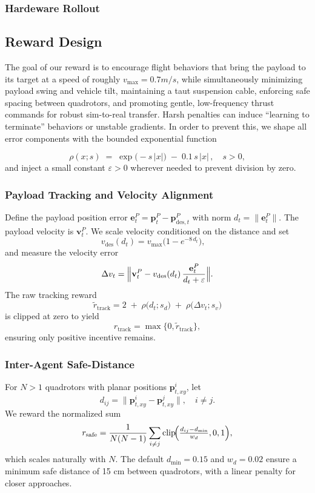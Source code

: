 \subsubsection{Hardeware Rollout}




\subsection{Reward Design}
The goal of our reward is to encourage flight behaviors that bring the payload to its target at a speed of roughly $ v_{\max} = 0.7m/s$, while simultaneously minimizing payload swing and vehicle tilt, maintaining a taut suspension cable, enforcing safe spacing between quadrotors, and promoting gentle, low-frequency thrust commands for robust sim-to-real transfer. Harsh penalties can induce “learning to terminate” behaviors or unstable gradients. In order to prevent this, we shape all error components with the bounded exponential function

\[
\rho(x; s) \;=\;\exp\bigl(-s\,|x|\bigr)\;-\;0.1\,s\,|x|\,,\quad s>0,
\]
and inject a small constant \(\varepsilon>0\) wherever needed to prevent division by zero.

\subsubsection{Payload Tracking and Velocity Alignment}
Define the payload position error \(\mathbf{e}^P_t = \mathbf{p}^P_t - \mathbf{p}^P_{\mathrm{des},t}\) with norm \(d_t = \|\mathbf{e}^P_t\|\).  The payload velocity is \(\mathbf{v}^P_t\).  We scale velocity conditioned on the distance and set
\[
v_{\mathrm{des}}(d_t)
= v_{\max}\bigl(1 - e^{-8\,d_t}\bigr),\quad
\]
and measure the velocity error
\[
\Delta v_t
= \Bigl\|\mathbf{v}^P_t - v_{\mathrm{des}}(d_t)\,\frac{\mathbf{e}^P_t}{d_t + \varepsilon}\Bigr\|.
\]
The raw tracking reward
\[
\tilde r_{\mathrm{track}}
= 2
\;+\;\rho\bigl(d_t; s_d\bigr)
\;+\;\rho\bigl(\Delta v_t; s_v\bigr)
\]
is clipped at zero to yield
\[
r_{\mathrm{track}}=\max\{0,\tilde r_{\mathrm{track}}\},
\]
ensuring only positive incentive remains.

\subsubsection{Inter-Agent Safe-Distance}
For \(N>1\) quadrotors with planar positions \(\mathbf{p}^i_{t,xy}\), let
\[
d_{ij} = \lVert\mathbf{p}^i_{t,xy}-\mathbf{p}^j_{t,xy}\rVert,\quad i\neq j.
\]
We reward the normalized sum
\[
r_{\mathrm{safe}}
= \frac{1}{N(N-1)}\sum_{i\neq j}\mathrm{clip}\!\Bigl(\tfrac{d_{ij}-d_{\min}}{w_d},0,1\Bigr),
\]
which scales naturally with \(N\). The default \(d_{\min}=0.15\) and \(w_d=0.02\) ensure a minimum safe distance of 15 cm between quadrotors, with a linear penalty for closer approaches.

